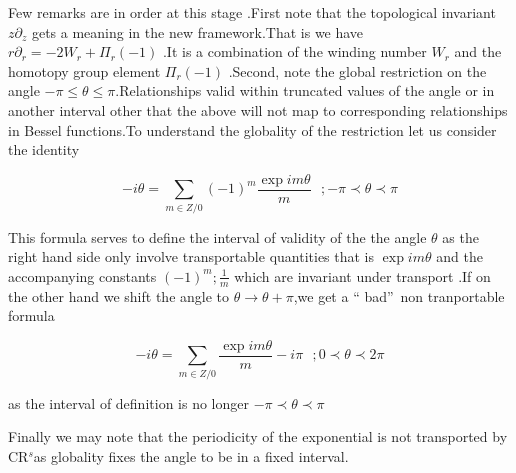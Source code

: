 \documentclass[a4paper,11pt]{article}
\begin{document}
Few remarks are in order at this stage .First note that the topological
invariant $z\partial _{z}$ gets a meaning in the new framework.That is we
have $r\partial _{r}=-2W_{r}+\Pi _{r}(-1)$ .It is a combination of the
winding number $W_{r}$ and the homotopy group element $\Pi _{r}(-1)$
.Second, note the global restriction on the angle $-\pi \leq \theta \leq \pi 
$.Relationships valid within truncated values of the angle or in another
interval other that the above will not map to corresponding relationships in
Bessel functions.To understand the globality of the restriction let us
consider the identity

\[
-i\theta =\sum_{m\in Z/0}(-1)^{m}\frac{\exp im\theta }{m}\textrm{ };-\pi \prec
\theta \prec \pi 
\]

This formula serves to define the interval of validity of the the angle $%
\theta $ as the right hand side only involve transportable quantities that
is $\exp im\theta $ and the accompanying constants $(-1)^{m};\frac{1}{m}$
which are invariant under transport .If on the other hand we shift the angle
to $\theta \rightarrow \theta +\pi $,we get a \textquotedblleft
bad\textquotedblright\ non tranportable formula

\[
-i\theta =\sum_{m\in Z/0}\frac{\exp im\theta }{m}-i\pi \textrm{ };0\prec
\theta \prec 2\pi 
\]

as the interval of definition is no longer $-\pi \prec \theta \prec \pi $

Finally we may note that the periodicity of the exponential is not
transported by CR$^{s}$as globality fixes the angle to be in a fixed
interval.
\end{document}
